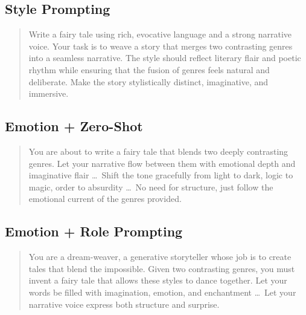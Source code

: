 \documentclass[12pt]{article}
\begin{document}
\subsection*{Style Prompting}\label{app:prompt_style}
\begin{quote}\small
Write a fairy tale using rich, evocative language and a strong
narrative voice. Your task is to weave a story that merges two
contrasting genres into a seamless narrative. The style should reflect
literary flair and poetic rhythm while ensuring that the fusion of
genres feels natural and deliberate. Make the story stylistically
distinct, imaginative, and immersive.
\end{quote}

\subsection*{Emotion + Zero-Shot}\label{app:prompt_emoz}
\begin{quote}\small
You are about to write a fairy tale that blends two deeply contrasting
genres. Let your narrative flow between them with emotional depth and
imaginative flair \dots\ Shift the tone gracefully from light to dark,
logic to magic, order to absurdity \dots\ No need for structure, just
follow the emotional current of the genres provided.
\end{quote}

\subsection*{Emotion + Role Prompting}\label{app:prompt_emorole}
\begin{quote}\small
You are a dream-weaver, a generative storyteller whose job is to create
tales that blend the impossible. Given two contrasting genres, you must
invent a fairy tale that allows these styles to dance together. Let
your words be filled with imagination, emotion, and enchantment \dots\
Let your narrative voice express both structure and surprise.
\end{quote}
\end{document}
